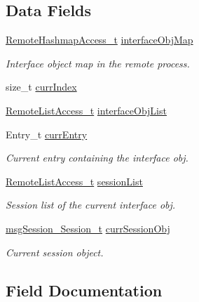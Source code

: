 \subsection*{Data Fields}
\begin{DoxyCompactItemize}
\item 
\hyperlink{struct_remote_hashmap_access__t}{Remote\+Hashmap\+Access\+\_\+t} \hyperlink{struct_session_obj_iter__t_ac3db9e07ac50a35f02c9bc6dd5e09ae1}{interface\+Obj\+Map}
\begin{DoxyCompactList}\small\item\em Interface object map in the remote process. \end{DoxyCompactList}\item 
size\+\_\+t \hyperlink{struct_session_obj_iter__t_a8de68cd8f6a47d70d8427383bf15ef86}{curr\+Index}
\item 
\hyperlink{struct_remote_list_access__t}{Remote\+List\+Access\+\_\+t} \hyperlink{struct_session_obj_iter__t_a4d36561cabb15feacf32451f8c6df3bb}{interface\+Obj\+List}
\item 
Entry\+\_\+t \hyperlink{struct_session_obj_iter__t_a08cfe30502e07b80131a08cdf51b1e36}{curr\+Entry}
\begin{DoxyCompactList}\small\item\em Current entry containing the interface obj. \end{DoxyCompactList}\item 
\hyperlink{struct_remote_list_access__t}{Remote\+List\+Access\+\_\+t} \hyperlink{struct_session_obj_iter__t_ac94a6770e7d8c8d0c8fc85e93f0297a7}{session\+List}
\begin{DoxyCompactList}\small\item\em Session list of the current interface obj. \end{DoxyCompactList}\item 
\hyperlink{structmsg_session___session__t}{msg\+Session\+\_\+\+Session\+\_\+t} \hyperlink{struct_session_obj_iter__t_ad1c97a44dc86ff59b2feb8b497ddc890}{curr\+Session\+Obj}
\begin{DoxyCompactList}\small\item\em Current session object. \end{DoxyCompactList}\end{DoxyCompactItemize}


\subsection{Field Documentation}
